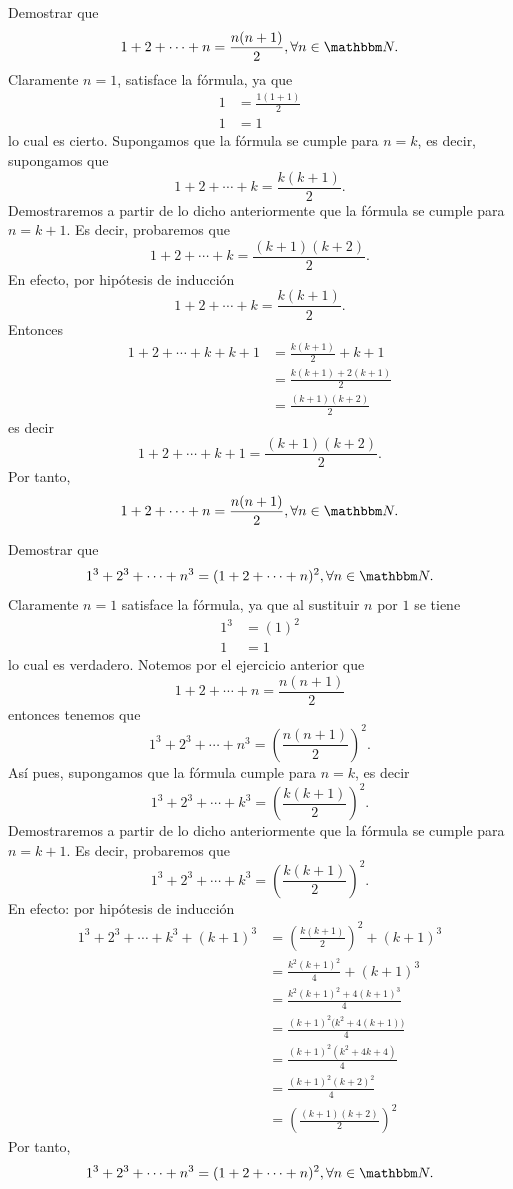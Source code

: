 \begin{example}
    Demostrar que
    $$1+2+\cdots +n=\frac{n(n+1)}{2}, \forall n \in \NN.$$\newpage
    \demostracion Claramente $n=1$, satisface la fórmula, ya que
    \begin{align*}
        1 &=\frac{1(1+1)}{2} \\
        1 &=1
    \end{align*}
    lo cual es cierto. Supongamos que la fórmula se cumple para $n=k$, es decir, supongamos que
    $$1+2+\cdots +k=\frac{k(k+1)}{2}.$$
    Demostraremos a partir de lo dicho anteriormente que la fórmula se cumple para $n=k+1$. Es decir, probaremos que
    $$1+2+\cdots +k=\frac{(k+1)(k+2)}{2}.$$
    En efecto, por hipótesis de inducción
    $$1+2+\cdots +k=\frac{k(k+1)}{2}.$$
    Entonces
    \begin{align*}
        1+2+\cdots +k+k+1 &=\frac{k(k+1)}{2}+k+1 \\
        &=\frac{k(k+1)+2(k+1)}{2} \\
        &=\frac{(k+1)(k+2)}{2}
    \end{align*}
    es decir
    $$1+2+\cdots +k+1=\frac{(k+1)(k+2)}{2}.$$
    Por tanto,
    $$1+2+\cdots +n=\frac{n(n+1)}{2}, \forall n \in \NN.$$
\end{example}

\begin{example}
    Demostrar que
    $$1^3+2^3+\cdots +n^3=(1+2 +\cdots +n)^2, \forall n \in \NN.$$
    \demostracion Claramente $n=1$ satisface la fórmula, ya que al sustituir $n$ por $1$ se tiene
    \begin{align*}
        1^3 &=(1)^2 \\
        1 &=1
    \end{align*}
    lo cual es verdadero. Notemos por el ejercicio anterior que
    $$1+2+\cdots +n=\frac{n(n+1)}{2}$$
    entonces tenemos que
    $$1^3+2^3+\cdots +n^3=\left( \frac{n(n+1)}{2} \right)^2.$$
    Así pues, supongamos que la fórmula cumple para $n=k$, es decir
    $$1^3+2^3+\cdots +k^3=\left( \frac{k(k+1)}{2} \right)^2.$$\newpage\noindent
    Demostraremos a partir de lo dicho anteriormente que la fórmula se cumple para $n=k+1$. Es decir, probaremos que
    $$1^3+2^3+\cdots +k^3=\left( \frac{k(k+1)}{2} \right)^2.$$
    En efecto: por hipótesis de inducción
    \begin{align*}
        1^3 +2^3+ \cdots +k^3+(k+1)^3 &=\left( \frac{k(k+1)}{2} \right)^2 +(k+1)^3\\
        &=\frac{k^2(k+1)^2}{4}+(k+1)^3 \\
        &=\frac{k^2(k+1)^2+4(k+1)^3}{4} \\
        &=\frac{(k+1)^2\big(k^2+4(k+1)\big)}{4} \\
        &=\frac{(k+1)^2 (k^2+4k+4)}{4} \\
        &=\frac{(k+1)^2(k+2)^2}{4} \\
        &=\left(\frac{(k+1)(k+2)}{2}\right)^2
    \end{align*}
    Por tanto,
    $$1^3+2^3+\cdots +n^3=(1+2+\cdots +n)^2, \forall n \in \NN.$$
\end{example}

